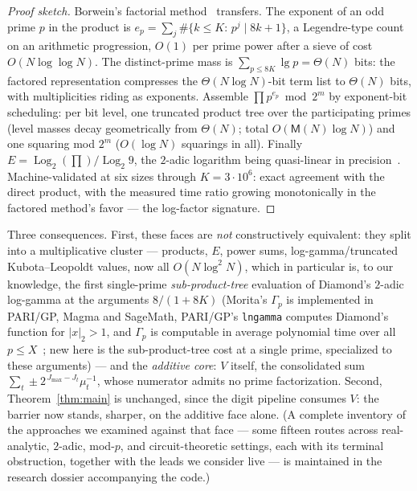 \documentclass[11pt]{article}
\theoremstyle{remark}
\theoremstyle{definition}
\newcommand{\M}{\mathsf{M}}
\begin{document}
\begin{proof}[Proof sketch]
Borwein's factorial method~\cite{Borwein85} transfers. The exponent of an
odd prime $p$ in the product is
$e_p=\sum_j \#\{k\le K:\,p^{j}\mid 8k+1\}$, a Legendre-type count on an
arithmetic progression, $O(1)$ per prime power after a sieve of cost
$O(N\log\log N)$. The distinct-prime mass is
$\sum_{p\le 8K}\lg p=\Theta(N)$ bits: the factored representation
compresses the $\Theta(N\log N)$-bit term list to $\Theta(N)$ bits, with
multiplicities riding as exponents. Assemble $\prod p^{e_p}\bmod 2^{m}$
by exponent-bit scheduling: per bit level, one truncated product tree
over the participating primes (level masses decay geometrically from
$\Theta(N)$; total $O(\M(N)\log N)$) and one squaring mod $2^{m}$
($O(\log N)$ squarings in all). Finally
$E=\operatorname{Log}_2(\prod)/\operatorname{Log}_2 9$, the $2$-adic
logarithm being quasi-linear in precision~\cite{CMTV21}.
Machine-validated at six sizes through $K=3\cdot10^{6}$: exact agreement
with the direct product, with the measured time ratio growing
monotonically in the factored method's favor --- the log-factor
signature.
\end{proof}

Three consequences. First, these faces are \emph{not} constructively
equivalent: they split into a multiplicative cluster --- products, $E$,
power sums, log-gamma/truncated Kubota--Leopoldt values, now all
$O(N\log^{2}N)$, which in particular is, to our knowledge, the first
single-prime \emph{sub-product-tree} evaluation of Diamond's $2$-adic
log-gamma at the arguments $8/(1+8K)$ (Morita's $\Gamma_p$ is implemented in
PARI/GP, Magma and SageMath, PARI/GP's \texttt{lngamma} computes Diamond's
function for $|x|_2>1$, and $\Gamma_p$ is computable in average polynomial
time over all $p\le X$~\cite{CKR20,CKR24}; new here is the sub-product-tree
cost at a single prime, specialized to these arguments) --- and
the \emph{additive core}: $V$ itself, the consolidated sum
$\sum_t\pm2^{\,J_{\max}-J_t}\mu_t^{-1}$, whose numerator admits no prime
factorization. Second, Theorem~\ref{thm:main} is unchanged, since the
digit pipeline consumes $V$: the barrier now stands, sharper, on the
additive face alone. (A complete inventory of the approaches we examined
against that face --- some fifteen routes across real-analytic,
$2$-adic, mod-$p$, and circuit-theoretic settings, each with its
terminal obstruction, together with the leads we consider live --- is
maintained in the research dossier accompanying the code.)
\end{document}
